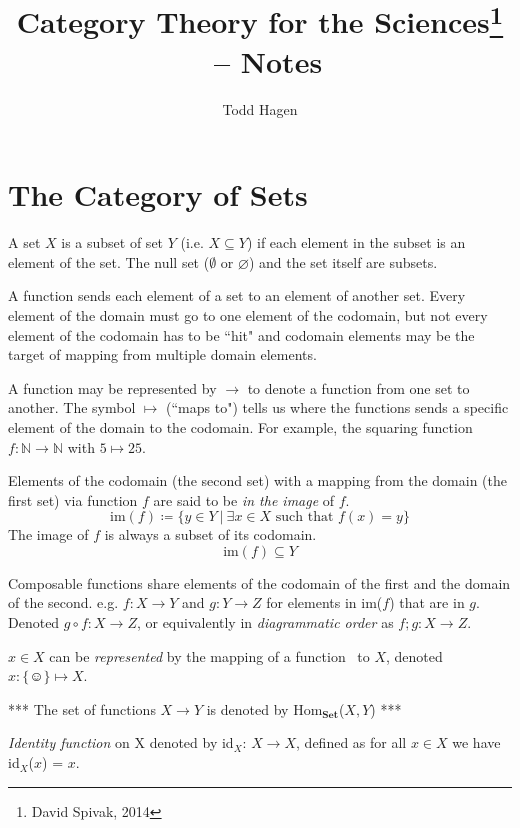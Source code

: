 \documentclass{article}
\author{Todd Hagen}
\title{Category Theory for the Sciences\footnote{David Spivak, 2014} \ -- Notes}
\begin{document}
\maketitle
\section{The Category of Sets}
A set $X$ is a subset of set $Y$ (i.e. $X \subseteq Y$) if each element in the subset is an element of the set. The null set ($\emptyset$ or $\varnothing$) and the set itself are subsets. 

A function sends each element of a set to an element of another set. Every element of the domain must go to one element of the codomain, but not every element of the codomain has to be ``hit" and codomain elements may be the target of mapping from multiple domain elements. 

A function may be represented by $\rightarrow$ to denote a function from one set to another. The symbol $\mapsto$ (``maps to") tells us where the functions sends a specific element of the domain to the codomain. For example, the squaring function $f: \mathbb{N} \rightarrow \mathbb{N}$ with $5 \mapsto 25$. 

Elements of the codomain (the second set) with a mapping from the domain (the first set) via function $f$  are said to be \textit{in the image} of $f$. 
\begin{equation*}
\text{im}(f) \coloneqq \{y \in Y\ |\ \exists x \in X \text{ such that } f(x) = y\}
\end{equation*} 
The image of $f$ is always a subset of its codomain.
\begin{equation*}
\text{im}(f) \subseteq Y
\end{equation*}

Composable functions share elements of the codomain of the first and the domain of the second. e.g. $f: X \rightarrow Y$ and $g: Y \rightarrow Z$ for elements in im($f$) that are in $g$. Denoted $g \circ f: X \rightarrow Z$, or equivalently in \textit{diagrammatic order} as $f;g: X \rightarrow Z$.

$x \in X$ can be \textit{represented} by the mapping of a function \smiley\ to $X$, denoted $x: \{ \smiley \} \mapsto X$. 

*** The set of functions $X \rightarrow Y$ is denoted by Hom$_{\textbf{Set}}$($X,Y$) ***

\textit{Identity function} on X denoted by id$_{X}$: $X \rightarrow X$, defined as for all $x \in X$ we have id$_{X}$($x$) = $x$.
\end{document}
